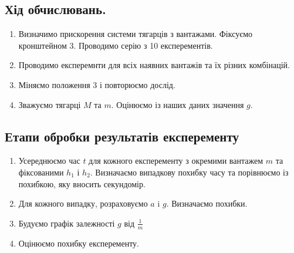 \documentclass[a4paper,12pt]{article}
\begin{document}
\subsection{Хід обчислювань. }
	\begin{enumerate}
		\item Визначимо прискорення системи тягарців з вантажами. Фіксуємо кронштейном 3. Проводимо серію з 10 експерементів.
		\item Проводимо експеремнти для всіх наявних вантажів та їх різних комбінацій.
		\item Міняємо положення 3 і повторюємо дослід.
		\item Зважуємо тягарці $M$ та $m$. Оцінюємо із наших даних значення $g$. 
	\end{enumerate}
\subsection{Етапи обробки результатів експеременту}
\begin{enumerate}
	\item Усереднюємо час $t$ для кожного експеременту з окремими вантажем $m$ та фіксованими $h_1$ і $h_2$. Визначаємо випадкову похибку часу та порівнюємо із похибкою, яку вносить секундомір. 
	\item Для кожного випадку, розраховуємо $a$ i $g$. Визначаємо похибки.
	\item Будуємо графік залежності $g$ від $\frac1m$
	\item Оцінюємо похибку експеременту.
\end{enumerate}
\newpage
\end{document}
